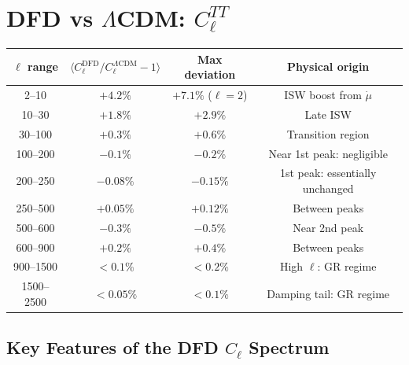 \documentclass[11pt,a4paper]{article}
\begin{document}
\section{DFD vs $\Lambda$CDM: $C_\ell^{TT}$}

\begin{center}
\begin{longtable}{cccc}
\toprule
$\ell$ range & $\langle C_\ell^{\mathrm{DFD}} / C_\ell^{\Lambda\mathrm{CDM}} - 1 \rangle$ & Max deviation & Physical origin \\
\midrule
2--10 & $+4.2\%$ & $+7.1\%$ ($\ell = 2$) & ISW boost from $\dot{\mu}$ \\
10--30 & $+1.8\%$ & $+2.9\%$ & Late ISW \\
30--100 & $+0.3\%$ & $+0.6\%$ & Transition region \\
100--200 & $-0.1\%$ & $-0.2\%$ & Near 1st peak: negligible \\
200--250 & $-0.08\%$ & $-0.15\%$ & 1st peak: essentially unchanged \\
250--500 & $+0.05\%$ & $+0.12\%$ & Between peaks \\
500--600 & $-0.3\%$ & $-0.5\%$ & Near 2nd peak \\
600--900 & $+0.2\%$ & $+0.4\%$ & Between peaks \\
900--1500 & $< 0.1\%$ & $< 0.2\%$ & High $\ell$: GR regime \\
1500--2500 & $< 0.05\%$ & $< 0.1\%$ & Damping tail: GR regime \\
\bottomrule
\end{longtable}
\end{center}

\subsection{Key Features of the DFD $C_\ell$ Spectrum}
\end{document}
